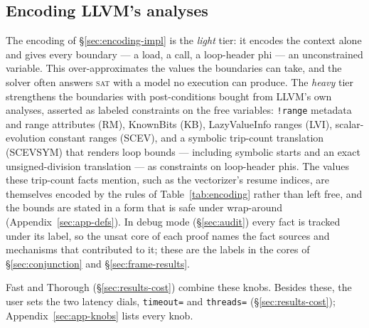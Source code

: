 \documentclass[acmsmall,screen,nonacm]{acmart}
\begin{document}
\subsection{Encoding LLVM's analyses}
\label{sec:system-facts}
The encoding of \S\ref{sec:encoding-impl} is the \emph{light} tier: it encodes the context alone and gives every boundary --- a load, a call, a loop-header phi --- an unconstrained variable. This over-approximates the values the boundaries can take, and the solver often answers \textsc{sat} with a model no execution can produce. The \emph{heavy} tier strengthens the
boundaries with post-conditions bought from LLVM's own analyses,
asserted as labeled constraints on the free variables:
\texttt{!range} metadata and range attributes (RM), KnownBits (KB),
LazyValueInfo ranges (LVI), scalar-evolution constant ranges (SCEV),
and a symbolic trip-count translation (SCEVSYM) that renders loop
bounds --- including symbolic starts and an exact unsigned-division
translation --- as constraints on loop-header phis. The values these
trip-count facts mention, such as the vectorizer's resume indices, are
themselves encoded by the rules of Table~\ref{tab:encoding} rather than
left free, and the bounds are stated in a form that is safe under
wrap-around (Appendix~\ref{sec:app-defs}). In debug mode
(\S\ref{sec:audit}) every fact is tracked under its label, so the unsat
core of each proof names the fact sources and mechanisms that contributed
to it; these are the labels in the cores of \S\ref{sec:conjunction} and
\S\ref{sec:frame-results}. 

Fast and Thorough (\S\ref{sec:results-cost}) combine these knobs. Besides these, the user sets the two latency dials, \texttt{timeout=} and \texttt{threads=} (\S\ref{sec:results-cost}); Appendix~\ref{sec:app-knobs} lists every knob.
\end{document}
